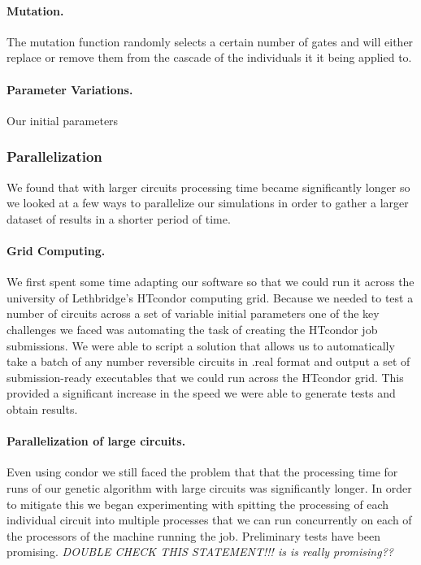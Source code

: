 \paragraph{Mutation.}

The mutation function randomly selects a certain number of gates and will either replace or remove them from the cascade of the 
individuals it it being applied to.

\paragraph{Parameter Variations.}

Our initial parameters


\subsubsection{Parallelization}

We found that with larger circuits processing time became significantly longer so we looked at a few ways to parallelize our simulations 
in order to gather a larger dataset of results in a shorter period of time.

\paragraph{Grid Computing.}

We first spent some time adapting our software so that we could run it across the university of Lethbridge's HTcondor computing grid. 
Because we needed to test a number of circuits across a set of variable initial parameters one of the key challenges we faced was 
automating the task of creating the HTcondor job submissions. We were able to script a solution that allows us to automatically take 
a batch of any number reversible circuits in .real format and output a set of submission-ready executables that we could run across 
the HTcondor grid. This provided a significant increase in the speed we were able to generate tests and obtain results.

\paragraph{Parallelization of large circuits.}

Even using condor we still faced the problem that that the processing time for runs of our genetic algorithm with large circuits was 
significantly longer. In order to mitigate this we began experimenting with spitting the processing of each individual circuit into 
multiple processes that we can run concurrently on each of the processors of the machine running the job. Preliminary tests have been 
promising.   \emph{  DOUBLE CHECK THIS STATEMENT!!! is is really promising??}